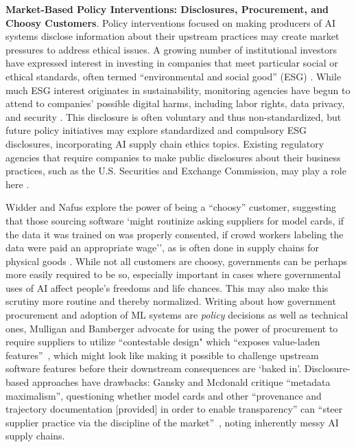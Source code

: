 \documentclass[nonacm]{acmart}
\begin{document}
\noindent\textbf{Market-Based Policy Interventions: Disclosures, Procurement, and Choosy Customers}. Policy interventions focused on making producers of AI systems disclose information about their upstream practices may create market pressures to address ethical issues. A growing number of institutional investors have expressed interest in investing in companies that meet particular social or ethical standards, often termed “environmental and social good” (ESG) \cite{Schreck2013Disclosure,Kaissar2022Institutional}. While much ESG interest originates in sustainability, monitoring agencies have begun to attend to companies' possible digital harms, including labor rights, data privacy, and security \cite{GlobalReportingInitiativeGRI}. This disclosure is often voluntary and thus non-standardized, but future policy initiatives may explore standardized and compulsory ESG disclosures, incorporating AI supply chain ethics topics. Existing regulatory agencies that require companies to make public disclosures about their business practices, such as the U.S. Securities and Exchange Commission, may play a role here \cite{wong2023privacy}. 

Widder and Nafus explore the power of being a ``choosy'' customer, suggesting that those sourcing software `might routinize asking suppliers for model cards, if the data it was trained on was properly consented, if crowd workers labeling the data were paid an appropriate wage'', as is often done in supply chains for physical goods \cite{widder2022dislocateda}.
While not all customers are choosy, governments can be perhaps more easily required to be so, especially important in cases where governmental uses of AI affect people's freedoms and life chances.
This may also make this scrutiny more routine and thereby normalized. Writing about how government procurement and adoption of ML systems are \textit{policy} decisions as well as technical ones, Mulligan and Bamberger advocate for using the power of procurement to require suppliers to utilize ``contestable design" which ``exposes value-laden features''~\cite{mulligan2019procurement}, which might look like making it possible to challenge upstream software features before their downstream consequences are `baked in'.
Disclosure-based approaches have drawbacks: Gansky and Mcdonald critique ``metadata maximalism'', questioning whether model cards and other ``provenance and trajectory documentation [provided] in order to enable transparency'' can ``steer supplier practice via the discipline of the market''~\cite{gansky2022counterfacctual}, noting inherently messy AI supply chains. 
\end{document}
